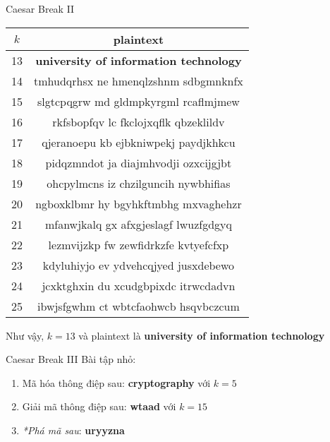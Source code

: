 \begin{frame}{Caesar Break II}
\begin{table}
\begin{tabular}{| c | c |}
\hline
$k$ & plaintext \\ \hline
13 & \textbf{university of information technology} \\ \hline
14 & tmhudqrhsx ne hmenqlzshnm sdbgmnknfx \\ \hline
15 & slgtcpqgrw md gldmpkyrgml rcaflmjmew \\ \hline
16 & rkfsbopfqv lc fkclojxqflk qbzeklildv \\ \hline
17 & qjeranoepu kb ejbkniwpekj paydjkhkcu \\ \hline
18 & pidqzmndot ja diajmhvodji ozxcijgjbt \\ \hline
19 & ohcpylmcns iz chzilguncih nywbhifias \\ \hline
20 & ngboxklbmr hy bgyhkftmbhg mxvaghehzr \\ \hline
21 & mfanwjkalq gx afxgjeslagf lwuzfgdgyq \\ \hline
22 & lezmvijzkp fw zewfidrkzfe kvtyefcfxp \\ \hline
23 & kdyluhiyjo ev ydvehcqjyed jusxdebewo \\ \hline
24 & jcxktghxin du xcudgbpixdc itrwcdadvn \\ \hline
25 & ibwjsfgwhm ct wbtcfaohwcb hsqvbczcum \\ \hline
\end{tabular}
\end{table}
Như vậy, $k=13$ và plaintext là \textbf{university of information technology}
\end{frame}

\begin{frame}{Caesar Break III}
Bài tập nhỏ:
\begin{enumerate}
\item Mã hóa thông điệp sau: \textbf{cryptography} với $k=5$
\item Giải mã thông điệp sau: \textbf{wtaad} với $k=15$
\item \textit{*Phá mã sau}: \textbf{uryyzna}
\end{enumerate}
\end{frame}

